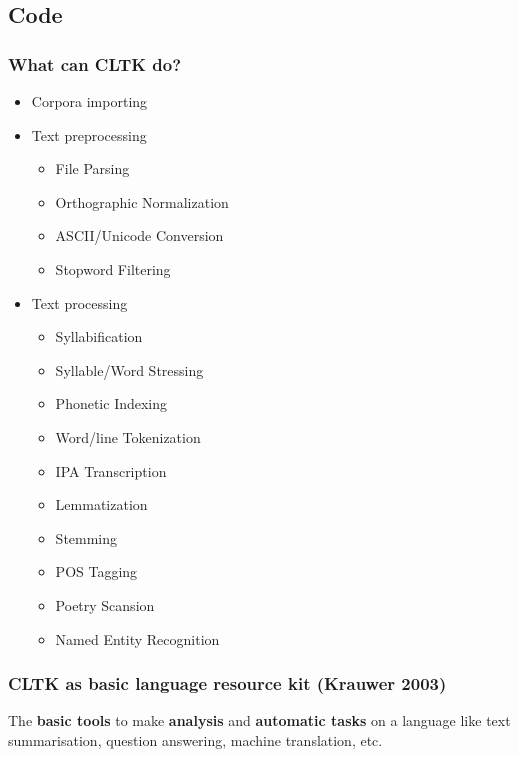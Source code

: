 \documentclass{beamer}
\begin{document}
\subsection{Code}

\begin{frame}
\frametitle{What can CLTK do?}
\begin{itemize}
    \item Corpora importing
    \item Text preprocessing
    \begin{itemize}
        \item File Parsing
        \item Orthographic Normalization
        \item ASCII/Unicode Conversion
        \item Stopword Filtering
    \end{itemize}
    \item Text processing
    \begin{itemize}
    \item Syllabification
    \item Syllable/Word Stressing
    \item Phonetic Indexing
    \item Word/line Tokenization
    \item IPA Transcription
    \item Lemmatization
    \item Stemming
    \item POS Tagging
    \item Poetry Scansion
    \item Named Entity Recognition
    \end{itemize}
\end{itemize}
\end{frame}

\begin{frame}
\frametitle{CLTK as \textbf{b}asic \textbf{la}nguage \textbf{r}esource \textbf{k}it (Krauwer 2003)}
The \textbf{basic tools} to make \textbf{analysis} and \textbf{automatic tasks} on a language like text summarisation, question answering, machine translation, etc.

\end{frame}



\end{document}
